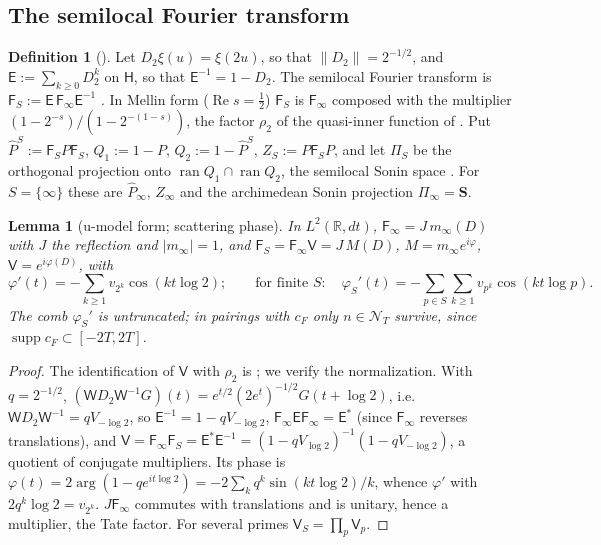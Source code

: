 \documentclass[11pt]{amsart}
\newtheorem{lemma}[theorem]{Lemma}
\theoremstyle{definition}
\newtheorem{definition}[theorem]{Definition}
\theoremstyle{remark}
\newcommand{\R}{\mathbb R}
\newcommand{\Rel}{\operatorname{Re}}
\newcommand{\supp}{\operatorname{supp}}
\newcommand{\cF}{c_F}
\newcommand{\NT}{\mathcal N_T}
\begin{document}
\subsection{The semilocal Fourier transform}
\begin{definition}[\cite{CCM2023,CCquasi2020}]\label{def:FS}
Let $D_2\xi(u)=\xi(2u)$, so that $\|D_2\|=2^{-1/2}$, and $\mathsf E:=\sum_{k\ge0}D_2^k$ on $\mathsf H$, so that $\mathsf E^{-1}=1-D_2$. The semilocal Fourier transform is $\mathsf F_S:=\mathsf E\,\mathsf F_\infty\mathsf E^{-1}$
\cite[Prop.~4.1]{CCM2023}. In Mellin form ($\Rel s=\frac12$) $\mathsf F_S$ is $\mathsf F_\infty$ composed with the multiplier
$(1-2^{-s})/(1-2^{-(1-s)})$, the factor $\rho_2$ of the quasi-inner function of \cite[Lemma~3.1]{CCquasi2020}. Put
$\widehat P^S:=\mathsf F_SP\mathsf F_S$, $Q_1:=1-P$, $Q_2:=1-\widehat P^S$, $Z_S:=P\mathsf F_SP$, and let $\Pi_S$ be the orthogonal
projection onto $\operatorname{ran}Q_1\cap\operatorname{ran}Q_2$, the semilocal Sonin space \cite{CCquasi2020}. For $S=\{\infty\}$
these are $\widehat P_\infty$, $Z_\infty$ and the archimedean Sonin projection $\Pi_\infty=\mathbf S$.
\end{definition}

\begin{lemma}[u-model form; scattering phase]\label{lem:sl-phase}
In $L^2(\R,dt)$, $\mathsf F_\infty=J\,m_\infty(D)$ with $J$ the reflection and $|m_\infty|=1$, and
$\mathsf F_S=\mathsf F_\infty\mathsf V=J\,M(D)$, $M=m_\infty e^{i\varphi}$, $\mathsf V=e^{i\varphi(D)}$, with
\[
\varphi'(t)=-\sum_{k\ge1}v_{2^k}\cos(kt\log2);\qquad\text{for finite }S:\quad
\varphi_S'(t)=-\sum_{p\in S}\sum_{k\ge1}v_{p^k}\cos(kt\log p).
\]
The comb $\varphi_S'$ is untruncated; in pairings with $\cF$ only $n\in\NT$ survive, since $\supp\cF\subset[-2T,2T]$.
\end{lemma}
\begin{proof}
The identification of $\mathsf V$ with $\rho_2$ is \cite[Lemma~3.1]{CCquasi2020}; we verify the normalization. With
$q=2^{-1/2}$, $(\mathsf WD_2\mathsf W^{-1}G)(t)=e^{t/2}(2e^t)^{-1/2}G(t+\log2)$, i.e.\ $\mathsf WD_2\mathsf W^{-1}=qV_{-\log2}$, so
$\mathsf E^{-1}=1-qV_{-\log2}$, $\mathsf F_\infty\mathsf E\mathsf F_\infty=\mathsf E^*$ (since $\mathsf F_\infty$ reverses translations), and
$\mathsf V=\mathsf F_\infty\mathsf F_S=\mathsf E^*\mathsf E^{-1}=(1-qV_{\log2})^{-1}(1-qV_{-\log2})$, a quotient of conjugate multipliers. Its
phase is $\varphi(t)=2\arg(1-qe^{it\log2})=-2\sum_kq^k\sin(kt\log2)/k$, whence $\varphi'$ with $2q^k\log2=v_{2^k}$.
$J\mathsf F_\infty$ commutes with translations and is unitary, hence a multiplier, the Tate factor. For several primes
$\mathsf V_S=\prod_p\mathsf V_p$.
\end{proof}
\end{document}
